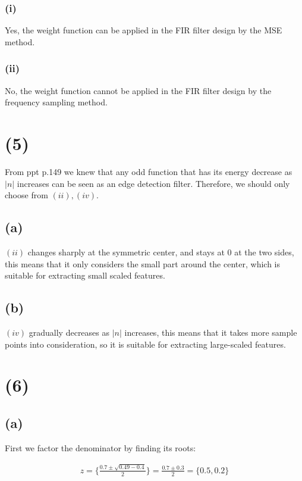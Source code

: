 \documentclass{article}
\begin{document}
\subsubsection*{(i)}

Yes, the weight function can be applied in the FIR filter design by the MSE method.  

\subsubsection*{(ii)}

No, the weight function cannot be applied in the FIR filter design by the frequency sampling method.  

\section*{(5)}

From ppt p.149 we knew that any odd function that has its energy decrease as $|n|$ increases can be seen as an edge detection filter.
Therefore, we should only choose from $(ii), (iv)$.

\subsection*{(a)}

$(ii)$ changes sharply at the symmetric center, and stays at $0$ at the two sides,
this means that it only considers the small part around the center,
which is suitable for extracting small scaled features.

\subsection*{(b)}

$(iv)$ gradually decreases as $|n|$ increases,
this means that it takes more sample points into consideration,
so it is suitable for extracting large-scaled features.

\section*{(6)}

\subsection*{(a)}

First we factor the denominator by finding its roots:

\begin{align*}
    z = \{\frac{0.7 \pm \sqrt{0.49 - 0.4}}{2}\} = \frac{0.7 \pm 0.3}{2} = \{0.5, 0.2\}
\end{align*}
\end{document}

